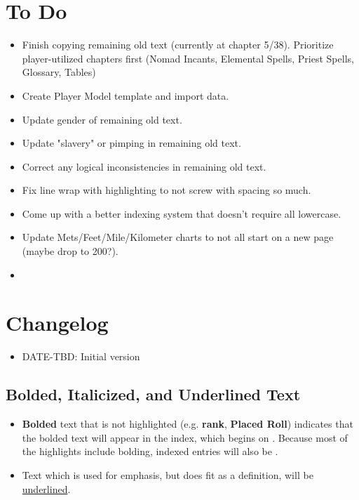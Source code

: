 \section{To Do}
\begin{itemize}
	\item Finish copying remaining old text (currently at chapter 5/38). Prioritize player-utilized chapters first (Nomad Incants, Elemental Spells, Priest Spells, Glossary, Tables)
	\item Create Player Model template and import data.
	\item Update gender of remaining old text.
	\item Update "slavery" or pimping in remaining old text.
	\item Correct any logical inconsistencies in remaining old text.
	\item Fix line wrap with highlighting to not screw with spacing so much.
	\item Come up with a better indexing system that doesn't require all lowercase.
	\item Update Mets/Feet/Mile/Kilometer charts to not all start on a new page (maybe drop to 200?).
	\item 
\end{itemize}
\section{Changelog}
\begin{itemize}[leftmargin=12pt]
\item DATE-TBD: Initial version
\end{itemize}
\subsection{Bolded, Italicized, and Underlined Text}
\begin{itemize}
\item \textbf{Bolded} text that is not highlighted (e.g. \textbf{rank}, \textbf{Placed Roll}) indicates that the bolded text will appear in the index, which begins on . Because most of the highlights include bolding, indexed entries will also be .
\item Text which is used for emphasis, but does fit as a definition, will be \ul{underlined}. 
\end{itemize}